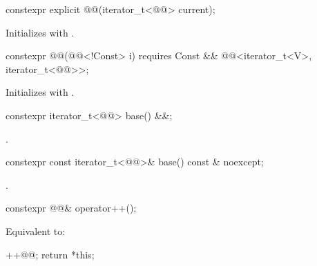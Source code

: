 %
\begin{itemdecl}
constexpr explicit @@(iterator_t<@@> current);
\end{itemdecl}

\begin{itemdescr}
\pnum
\effects
Initializes  with .
\end{itemdescr}

%
\begin{itemdecl}
constexpr @@(@@<!Const> i)
  requires Const && @@<iterator_t<V>, iterator_t<@@>>;
\end{itemdecl}

\begin{itemdescr}
\pnum
\effects
Initializes  with .
\end{itemdescr}

%
\begin{itemdecl}
constexpr iterator_t<@@> base() &&;
\end{itemdecl}

\begin{itemdescr}
\pnum
\returns
{}.
\end{itemdescr}

%
\begin{itemdecl}
constexpr const iterator_t<@@>& base() const & noexcept;
\end{itemdecl}

\begin{itemdescr}
\pnum
\returns
{}.
\end{itemdescr}

%
\begin{itemdecl}
constexpr @@& operator++();
\end{itemdecl}

\begin{itemdescr}
\pnum
\effects
Equivalent to:
\begin{codeblock}
++@@;
return *this;
\end{codeblock}
\end{itemdescr}


